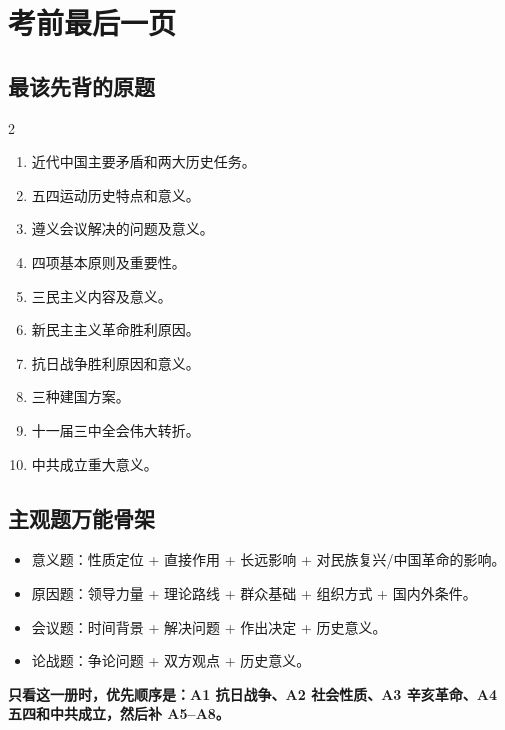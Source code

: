\documentclass[UTF8,zihao=-4]{ctexart}
\newcommand{\tagline}[2]{%
  \vspace{0.4em}
  \noindent
  \begingroup
  \setlength{\fboxsep}{7pt}
  \colorbox{soft}{%
    \parbox{\dimexpr\linewidth-14pt\relax}{%
      {\bfseries\textcolor{#1}{#2}}%
    }%
  }%
  \endgroup
  \vspace{0.25em}
}
\begin{document}
\newpage

\section{考前最后一页}

\subsection{最该先背的原题}
\begin{multicols}{2}
\begin{enumerate}
  \item 近代中国主要矛盾和两大历史任务。
  \item 五四运动历史特点和意义。
  \item 遵义会议解决的问题及意义。
  \item 四项基本原则及重要性。
  \item 三民主义内容及意义。
  \item 新民主主义革命胜利原因。
  \item 抗日战争胜利原因和意义。
  \item 三种建国方案。
  \item 十一届三中全会伟大转折。
  \item 中共成立重大意义。
\end{enumerate}
\end{multicols}

\subsection{主观题万能骨架}
\begin{itemize}
  \item 意义题：性质定位 + 直接作用 + 长远影响 + 对民族复兴/中国革命的影响。
  \item 原因题：领导力量 + 理论路线 + 群众基础 + 组织方式 + 国内外条件。
  \item 会议题：时间背景 + 解决问题 + 作出决定 + 历史意义。
  \item 论战题：争论问题 + 双方观点 + 历史意义。
\end{itemize}

\tagline{accent}{只看这一册时，优先顺序是：A1 抗日战争、A2 社会性质、A3 辛亥革命、A4 五四和中共成立，然后补 A5--A8。}
\end{document}
